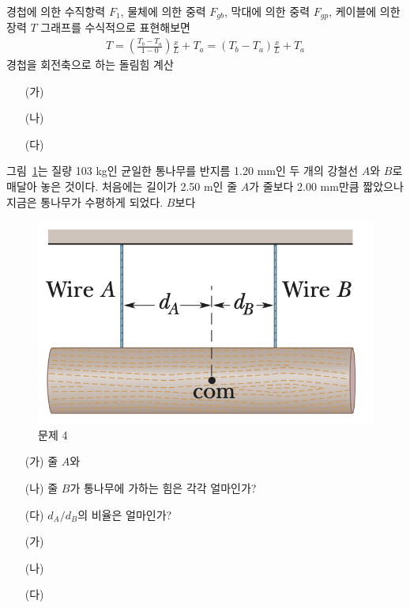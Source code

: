 \documentclass[floatfix,nofootinbib,superscriptaddress,fleqn]{revtex4-2}
\begin{document}
경첩에 의한 수직항력 $F_1$, 물체에 의한 중력 $F_{gb}$, 막대에 의한 중력 $F_{gp}$,
케이블에 의한 장력 $T$
그래프를 수식적으로 표현해보면
\begin{align}
  T = \left(\frac{T_b - T_a}{1-0}\right)\frac{x}{L}+T_a
  =\left(T_b - T_a\right)\frac{x}{L}+T_a
\end{align}
경첩을 회전축으로 하는 돌림힘 계산

\begin{itemize}
  \item[(가)]
  \item[(나)]
  \item[(다)]
\end{itemize}
\vspace{1.cm}


그림~\ref{fig:4}는 질량 103 kg인 균일한 통나무를 반지름 1.20 mm인 두
개의 강철선 $A$와 $B$로 매달아 놓은 것이다. 처음에는 길이가 2.50 m인
줄 $A$가 줄보다 2.00 mm만큼 짧았으나 지금은 통나무가 수평하게 되었다. 
$B$보다 
\begin{figure}[ht]
  \centering
\includegraphics[scale=0.25]{Qfig15-4-20220502.png}
  \caption{문제 4}
  \label{fig:4}
\end{figure}
\begin{itemize}
\item[(가)] 줄 $A$와
\item[(나)] 줄 $B$가 통나무에 가하는 힘은 각각 얼마인가? 
\item[(다)] $d_A/d_B$의 비율은 얼마인가? 
\end{itemize}

\begin{itemize}
  \item[(가)]
  \item[(나)]
  \item[(다)]
\end{itemize}
\end{document}
